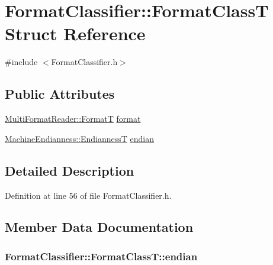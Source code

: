 \hypertarget{struct_format_classifier_1_1_format_class_t}{}\section{Format\+Classifier\+:\+:Format\+ClassT Struct Reference}
\label{struct_format_classifier_1_1_format_class_t}


{\ttfamily \#include $<$Format\+Classifier.\+h$>$}

\subsection*{Public Attributes}
\begin{DoxyCompactItemize}
\item 
\hyperlink{class_multi_format_reader_a6669d0a4e5bb7b72224b6769fea22566}{Multi\+Format\+Reader\+::\+FormatT} \hyperlink{struct_format_classifier_1_1_format_class_t_a743513705fe5c9a27547960c6be030ca}{format}
\item 
\hyperlink{class_machine_endianness_a1d179c9c1da7949f5670f5654e0be09b}{Machine\+Endianness\+::\+EndiannessT} \hyperlink{struct_format_classifier_1_1_format_class_t_ad371fa4756fd4e996f5394b61bac3e7c}{endian}
\end{DoxyCompactItemize}


\subsection{Detailed Description}


Definition at line 56 of file Format\+Classifier.\+h.



\subsection{Member Data Documentation}
\subsubsection[{\texorpdfstring{endian}{endian}}]{ Format\+Classifier\+::\+Format\+Class\+T\+::endian}\hypertarget{struct_format_classifier_1_1_format_class_t_ad371fa4756fd4e996f5394b61bac3e7c}{}\label{struct_format_classifier_1_1_format_class_t_ad371fa4756fd4e996f5394b61bac3e7c}



